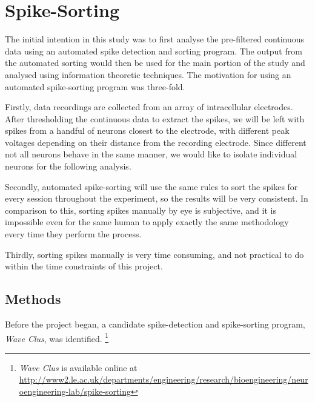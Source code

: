 \section{Spike-Sorting}
\label{sec:sorting}

The initial intention in this study was to first analyse the pre-filtered continuous data using an automated spike detection and sorting program. The output from the automated sorting would then be used for the main portion of the study and analysed using information theoretic techniques.
The motivation for using an automated spike-sorting program was three-fold.

Firstly, data recordings are collected from an array of intracellular electrodes. After thresholding the continuous data to extract the spikes, we will be left with spikes from a handful of neurons closest to the electrode, with different peak voltages depending on their distance from the recording electrode. Since different not all neurons behave in the same manner, we would like to isolate individual neurons for the following analysis.

Secondly, automated spike-sorting will use the same rules to sort the spikes for every session throughout the experiment, so the results will be very consistent. In comparison to this, sorting spikes manually by eye is subjective, and it is impossible even for the same human to apply exactly the same methodology every time they perform the process.

Thirdly, sorting spikes manually is very time consuming, and not practical to do within the time constraints of this project.

\subsection{Methods}

Before the project began, a candidate spike-detection and spike-sorting program, \textit{Wave Clus}, was identified.%
\footnote{
\textit{Wave Clus} is available online at
\url{http://www2.le.ac.uk/departments/engineering/research/bioengineering/neuroengineering-lab/spike-sorting}
}

